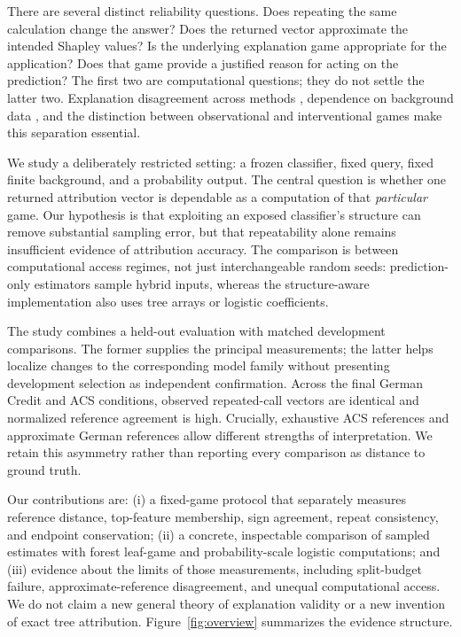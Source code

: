 \documentclass{article}
\begin{document}
There are several distinct reliability questions. Does repeating the same calculation change the answer? Does the returned vector approximate the intended Shapley values? Is the underlying explanation game appropriate for the application? Does that game provide a justified reason for acting on the prediction? The first two are computational questions; they do not settle the latter two. Explanation disagreement across methods \citep{Krishna2022}, dependence on background data \citep{Yuan2022}, and the distinction between observational and interventional games \citep{Chen2020} make this separation essential.

We study a deliberately restricted setting: a frozen classifier, fixed query, fixed finite background, and a probability output. The central question is whether one returned attribution vector is dependable as a computation of that \emph{particular} game. Our hypothesis is that exploiting an exposed classifier's structure can remove substantial sampling error, but that repeatability alone remains insufficient evidence of attribution accuracy. The comparison is between computational access regimes, not just interchangeable random seeds: prediction-only estimators sample hybrid inputs, whereas the structure-aware implementation also uses tree arrays or logistic coefficients.

The study combines a held-out evaluation with matched development comparisons. The former supplies the principal measurements; the latter helps localize changes to the corresponding model family without presenting development selection as independent confirmation. Across the final German Credit and ACS conditions, observed repeated-call vectors are identical and normalized reference agreement is high. Crucially, exhaustive ACS references and approximate German references allow different strengths of interpretation. We retain this asymmetry rather than reporting every comparison as distance to ground truth.

Our contributions are: (i) a fixed-game protocol that separately measures reference distance, top-feature membership, sign agreement, repeat consistency, and endpoint conservation; (ii) a concrete, inspectable comparison of sampled estimates with forest leaf-game and probability-scale logistic computations; and (iii) evidence about the limits of those measurements, including split-budget failure, approximate-reference disagreement, and unequal computational access. We do not claim a new general theory of explanation validity or a new invention of exact tree attribution. Figure~\ref{fig:overview} summarizes the evidence structure.
\end{document}
